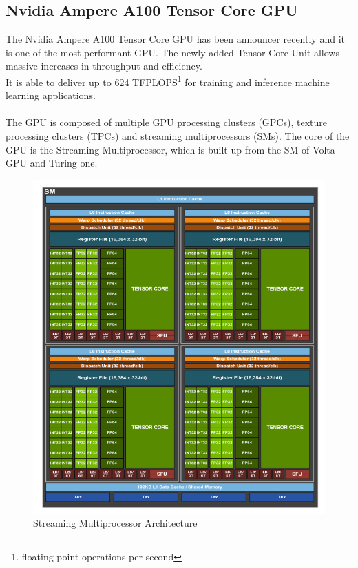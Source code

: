 \subsection{Nvidia Ampere A100 Tensor Core GPU}
The Nvidia Ampere A100 Tensor Core GPU has been announcer recently and it is one of the most performant GPU. The newly added Tensor Core Unit allows massive increases in throughput and efficiency.\\It is able to deliver up to 624 TFPLOPS\footnote{floating point operations per second} for training and inference machine learning applications.\\\\

The GPU is composed of multiple GPU processing clusters (GPCs), texture processing clusters (TPCs) and streaming multiprocessors (SMs).
The core of the GPU is the Streaming Multiprocessor, which is built up from the SM of Volta GPU and Turing one.
\begin{figure}[!htbp]
\centering
\captionsetup{justification=centering}
\includegraphics[scale=0.6]{./figure/volta_sm_arch.PNG}
\caption{Streaming Multiprocessor Architecture \cite{paper:41}}
\label{fig:voltasmarch}
\end{figure}


